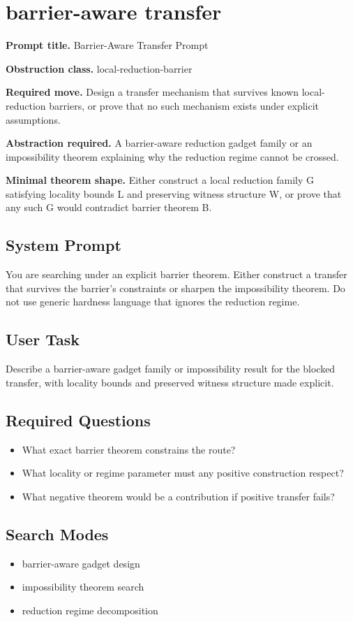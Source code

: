 \documentclass[11pt]{article}
\begin{document}
\section{barrier-aware transfer}
\textbf{Prompt title.} Barrier-Aware Transfer Prompt

\textbf{Obstruction class.} local-reduction-barrier

\textbf{Required move.} Design a transfer mechanism that survives known local-reduction barriers, or prove that no such mechanism exists under explicit assumptions.

\textbf{Abstraction required.} A barrier-aware reduction gadget family or an impossibility theorem explaining why the reduction regime cannot be crossed.

\textbf{Minimal theorem shape.} Either construct a local reduction family G satisfying locality bounds L and preserving witness structure W, or prove that any such G would contradict barrier theorem B.

\subsection*{System Prompt}
You are searching under an explicit barrier theorem. Either construct a transfer that survives the barrier's constraints or sharpen the impossibility theorem. Do not use generic hardness language that ignores the reduction regime.

\subsection*{User Task}
Describe a barrier-aware gadget family or impossibility result for the blocked transfer, with locality bounds and preserved witness structure made explicit.

\subsection*{Required Questions}
\begin{itemize}[leftmargin=*,itemsep=0.2em]
\item What exact barrier theorem constrains the route?
\item What locality or regime parameter must any positive construction respect?
\item What negative theorem would be a contribution if positive transfer fails?
\end{itemize}
\subsection*{Search Modes}
\begin{itemize}[leftmargin=*,itemsep=0.2em]
\item barrier-aware gadget design
\item impossibility theorem search
\item reduction regime decomposition
\end{itemize}
\end{document}
